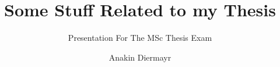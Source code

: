 \documentclass[aspectratio=169, onlytextwidth,  notheorems, sOuRcEs, fleqn, leqno, ]{RUCPresentation}
\title{%
    Some Stuff Related to my Thesis
}
\subtitle{Presentation For The MSc Thesis Exam}
\author[Anakin]{Anakin Diermayr\inst{1}}%
\institute[RUC]{
    \inst{1} Roskilde University
}
\newcommand\makebeamertitle{\frame{\maketitle}}%
\begin{document}
\makebeamertitle


%
%

%
%
\end{document}

